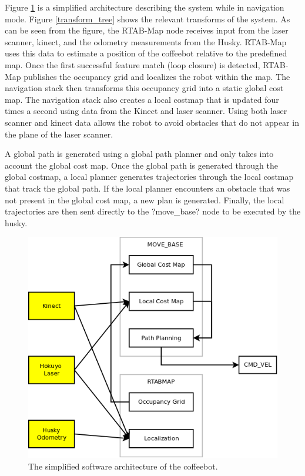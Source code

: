 \documentclass[letterpaper, 10 pt, conference]{ieeeconf}  %
\begin{document}
Figure \ref{software_architecture} is a simplified architecture describing the system while in navigation mode. Figure \ref{transform_tree} shows the relevant transforms of the system. As can be seen from the figure, the RTAB-Map node receives input from the laser scanner, kinect, and the odometry measurements from the Husky. RTAB-Map uses this data to estimate a position of the coffeebot relative to the predefined map. Once the first successful feature match (loop closure) is detected, RTAB-Map publishes the occupancy grid and localizes the robot within the map.  The navigation stack then transforms this occupancy grid into a static global cost map. The navigation stack also creates a local costmap that is updated four times a second using data from the Kinect and laser scanner. Using both laser scanner and kinect data allows the robot to avoid obstacles that do not appear in the plane of the laser scanner. 

A global path is generated using a global path planner and only takes into account the global cost map. Once the global path is generated through the global costmap, a local planner generates trajectories through the local costmap that track the global path. If the local planner encounters an obstacle that was not present in the global cost map, a new plan is generated. Finally, the local trajectories are then sent directly to the ?move\_base? node to be executed by the husky. 

	\begin{figure}[!ht]
		\centering
		\includegraphics[width=1.0\columnwidth]{Figures/ROS_node_diagram}
		\caption{The simplified software architecture of the coffeebot.}
		\label{software_architecture}
	\end{figure}
	
\end{document}
